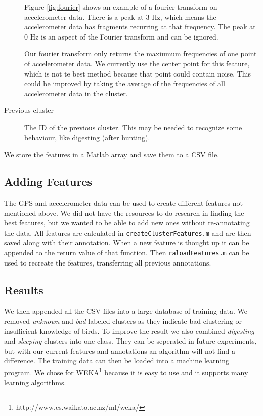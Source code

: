 \begin{description}
  Figure \ref{fig:fourier} shows an example of a fourier transform on accelerometer data. There is a peak at 3 Hz, which means the accelerometer data has fragments recurring at that frequency. The peak at 0 Hz is an aspect of the Fourier transform and can be ignored. 

  Our fourier transform only returns the maxiumum frequencies of one point of accelerometer data. We currently use the center point for this feature, which is not te best method because that point could contain noise. This could be improved by taking the average of the frequencies of all accelerometer data in the cluster.
  \item[Previous cluster] The ID of the previous cluster. This may be needed to recognize some behaviour, like digesting (after hunting).
 \end{description}

 We store the features in a Matlab array and save them to a CSV file.

\subsection{Adding Features}
The GPS and accelerometer data can be used to create different features not mentioned above. We did not have the resources to do research in finding the best features, but we wanted to be able to add new ones without re-annotating the data. All features are calculated in \verb|createClusterFeatures.m| and are then saved along with their annotation. When a new feature is thought up it can be appended to the return value of that function. Then \verb|raloadFeatures.m| can be used to recreate the features, transferring all previous annotations. 

 \subsection{Results}
 We then appended all the CSV files into a large database of training data. We removed \emph{unknown} and \emph{bad} labeled clusters as they indicate bad clustering or insufficient knowledge of birds. To improve the result we also combined \emph{digesting} and \emph{sleeping} clusters into one class. They can be seperated in future experiments, but with our current features and annotations an algorithm will not find a difference. The training data can then be loaded into a machine learning program. We chose for WEKA\footnote{http://www.cs.waikato.ac.nz/ml/weka/} because it is easy to use and it supports many learning algorithms.

